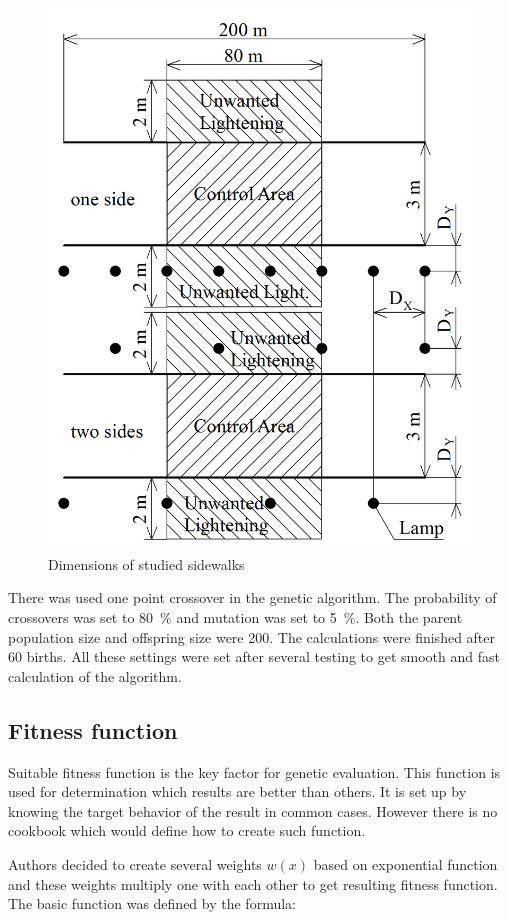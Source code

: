 \begin{figure}[htb]
  \centering
  \includegraphics[width=0.8\columnwidth]{kotyChodniku}
  \caption{Dimensions of studied sidewalks}
  \label{fig:sidewalk}
\end{figure}

There was used one point crossover in the genetic algorithm. The probability of crossovers was set to 80~\% and mutation was set to 5~\%. Both the parent population size and offspring size were 200. The calculations were finished after 60 births. All these settings were set after several testing to get smooth and fast calculation of the algorithm.

\subsection{Fitness function}
Suitable fitness function is the key factor for genetic evaluation. This function is used for determination which results are better than others. It is set up by knowing the target behavior of the result in common cases. However there is no cookbook which would define how to create such function.

Authors decided to create several weights $w\left(x\right)$ based on exponential function and these weights multiply one with each other to get resulting fitness function. The basic function was defined by the formula:

